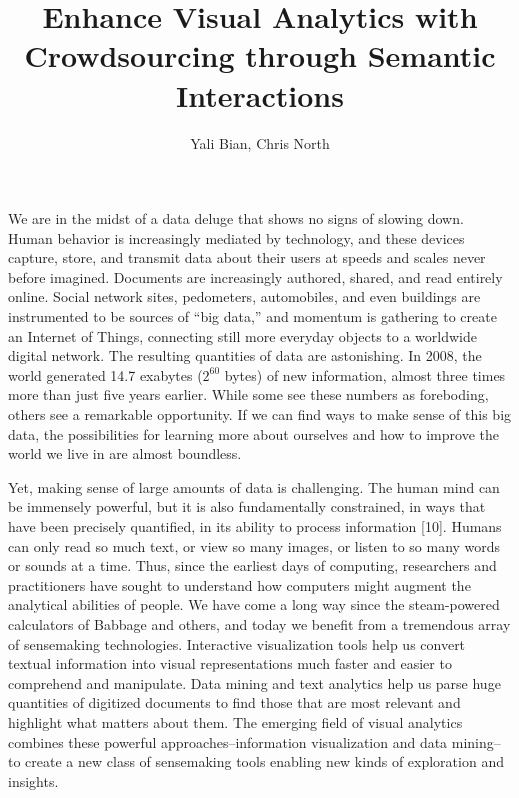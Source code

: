 \documentclass[journal]{vgtc}                %
\title{Enhance Visual Analytics with Crowdsourcing through Semantic Interactions}
\author{Yali Bian, Chris North}
\begin{document}
\maketitle

We are in the midst of a data deluge that shows no signs of slowing down. Human behavior is increasingly mediated by technology, and these devices capture, store, and transmit data about their users at speeds and scales never before imagined. Documents are increasingly authored, shared, and read entirely online. Social network sites, pedometers, automobiles, and even buildings are instrumented to be sources of “big data,” and momentum is gathering to create an Internet of Things, connecting still more everyday objects to a worldwide digital network. The resulting quantities of data are astonishing. In 2008, the world generated 14.7 exabytes ($2^60$ bytes) of new information, almost three times more than just five years earlier. While some see these numbers as foreboding, others see a remarkable opportunity. If we can find ways to make sense of this big data, the possibilities for learning more about ourselves and how to improve the world we live in are almost boundless.

Yet, making sense of large amounts of data is challenging. The human mind can be immensely powerful, but it is also fundamentally constrained, in ways that have been precisely quantified, in its ability to process information [10]. Humans can only read so much text, or view so many images, or listen to so many words or sounds at a time. Thus, since the earliest days of computing, researchers and practitioners have sought to understand how computers might augment the analytical abilities of people. We have come a long way since the steam-powered calculators of Babbage and others, and today we benefit from a tremendous array of sensemaking technologies. Interactive visualization tools help us convert textual information into visual representations much faster and easier to comprehend and manipulate. Data mining and text analytics help us parse huge quantities of digitized documents to find those that are most relevant and highlight what matters about them. The emerging field of visual analytics combines these powerful approaches--information visualization and data mining--to create a new class of sensemaking tools enabling new kinds of exploration and insights.
\end{document}
